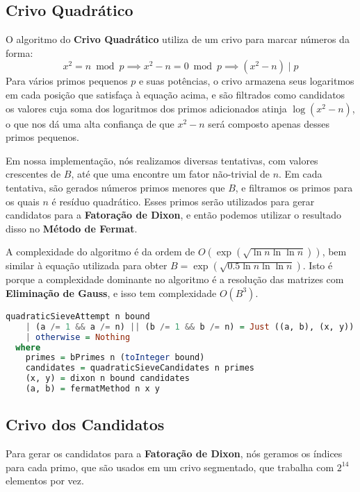 \documentclass{article}
\newcommand{\divides}{\mid}
\begin{document}
\subsection{Crivo Quadrático}
\label{quadraticSieve}
O algoritmo do \textbf{Crivo Quadrático} utiliza de um crivo para marcar números da forma:
$$ x^2 = n \bmod p \implies x^2 - n = 0 \bmod p \implies (x^2 - n) \divides p $$
Para vários primos pequenos $p$ e suas potências, o crivo armazena seus logaritmos em cada posição que satisfaça à equação acima, e são filtrados como candidatos os valores cuja soma dos logaritmos dos primos adicionados atinja $\log (x^2 - n)$, o que nos dá uma alta confiança de que $x^2 - n$ será composto apenas desses primos pequenos.

Em nossa implementação, nós realizamos diversas tentativas, com valores crescentes de $B$, até que uma encontre um fator não-trivial de $n$. Em cada tentativa, são gerados números primos menores que $B$, e filtramos os primos para os quais $n$ é resíduo quadrático. Esses primos serão utilizados para gerar candidatos para a \textbf{Fatoração de Dixon}, e então podemos utilizar o resultado disso no \textbf{Método de Fermat}.

A complexidade do algoritmo é da ordem de $O(\exp(\sqrt{\ln n \ln \ln n}))$, bem similar à equação utilizada para obter $B = \exp(\sqrt{0.5 \ln n \ln \ln n})$. Isto é porque a complexidade dominante no algoritmo é a resolução das matrizes com \textbf{Eliminação de Gauss}, e isso tem complexidade $O(B^3)$.

\begin{minipage}{0.9\linewidth}
\begin{lstlisting}[language=haskell,caption=Crivo Quadrático - Principal]
quadraticSieveAttempt n bound
    | (a /= 1 && a /= n) || (b /= 1 && b /= n) = Just ((a, b), (x, y))
    | otherwise = Nothing
  where
    primes = bPrimes n (toInteger bound)
    candidates = quadraticSieveCandidates n primes
    (x, y) = dixon n bound candidates
    (a, b) = fermatMethod n x y
\end{lstlisting}
\end{minipage}

\subsection{Crivo dos Candidatos}
\label{sieve}
Para gerar os candidatos para a \textbf{Fatoração de Dixon}, nós geramos os índices para cada primo, que são usados em um crivo segmentado, que trabalha com $2^{14}$ elementos por vez.
\end{document}
